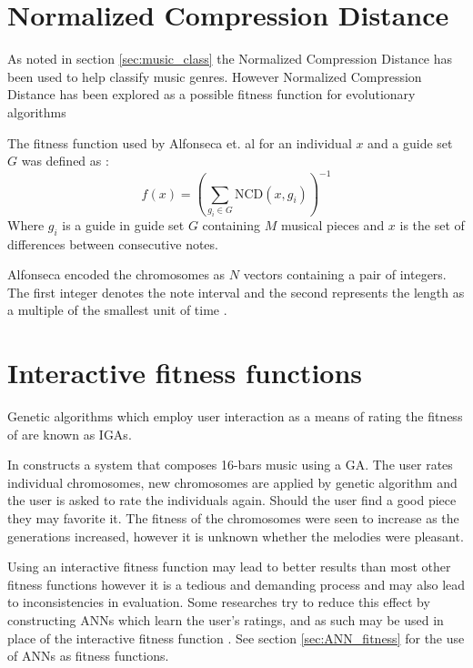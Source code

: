 \section{Normalized Compression Distance} \label{sec:ncdfitness}
As noted in section \ref{sec:music_class} the Normalized Compression Distance has been used to help classify music genres. However Normalized Compression Distance has been explored as a possible fitness function for evolutionary algorithms \cite{Alfonseca2007,Alfonseca:2005:ECM:1981094.1981161,Alfonseca2006}

The fitness function used by Alfonseca et. al for an individual $x$ and a guide set $G$ was defined as \cite{Alfonseca2006}: 
\begin{equation}f(x) = \left( \sum_{g_i\in G} \text{NCD}(x,g_i) \right)^{-1} \label{eq:ncdfitness} \end{equation}
Where $g_i$ is a guide in guide set $G$ containing $M$ musical pieces and $x$ is the set of differences between consecutive notes.

Alfonseca encoded the chromosomes as $N$ vectors containing a pair of integers. The first integer denotes the note interval and the second represents the length as a multiple of the smallest unit of time \cite{Alfonseca2007}.


\section{Interactive fitness functions} \label{sec:iga}
Genetic algorithms which employ user interaction as a means of rating the fitness of are known as \acfp{IGA}.

In \cite{Unehara} constructs a system that composes 16-bars music using a GA. The user rates individual chromosomes, new chromosomes are applied by genetic algorithm and the user is asked to rate the individuals again. Should the user find a good piece they may favorite it. The fitness of the chromosomes were seen to increase as the generations increased, however it is unknown whether the melodies were pleasant.

Using an interactive fitness function may lead to better results than most other fitness functions however it is a tedious and demanding process and may also lead to inconsistencies in evaluation.
Some researches try to reduce this effect by constructing \acp{ANN} which learn the user's ratings, and as such may be used in place of the interactive fitness function \cite{Biles1996,Spector_inductionand}. See section \ref{sec:ANN_fitness} for the use of \acp{ANN} as fitness functions.

